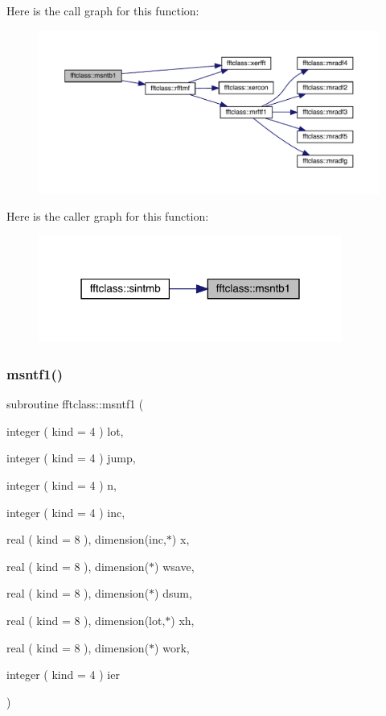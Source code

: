 Here is the call graph for this function\+:\nopagebreak
\begin{figure}[H]
\begin{center}
\leavevmode
\includegraphics[width=350pt]{namespacefftclass_aebd25014fd97baa3be31bda9b446e99f_cgraph}
\end{center}
\end{figure}
Here is the caller graph for this function\+:\nopagebreak
\begin{figure}[H]
\begin{center}
\leavevmode
\includegraphics[width=283pt]{namespacefftclass_aebd25014fd97baa3be31bda9b446e99f_icgraph}
\end{center}
\end{figure}
\mbox{\label{namespacefftclass_a151bd1685dbe69c9c36a08ff00a7e10e}} 
\subsubsection{\texorpdfstring{msntf1()}{msntf1()}}
{\footnotesize\ttfamily subroutine fftclass\+::msntf1 (\begin{DoxyParamCaption}\item[{integer ( kind = 4 )}]{lot,  }\item[{integer ( kind = 4 )}]{jump,  }\item[{integer ( kind = 4 )}]{n,  }\item[{integer ( kind = 4 )}]{inc,  }\item[{real ( kind = 8 ), dimension(inc,$\ast$)}]{x,  }\item[{real ( kind = 8 ), dimension($\ast$)}]{wsave,  }\item[{real ( kind = 8 ), dimension($\ast$)}]{dsum,  }\item[{real ( kind = 8 ), dimension(lot,$\ast$)}]{xh,  }\item[{real ( kind = 8 ), dimension($\ast$)}]{work,  }\item[{integer ( kind = 4 )}]{ier }\end{DoxyParamCaption})}

